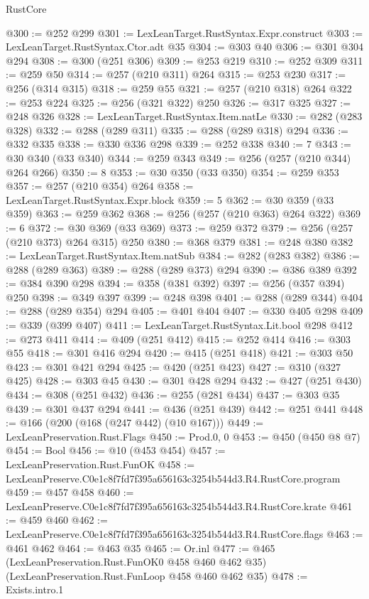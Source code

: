 \begin{lexlean}{RustCore}
\begin{coremodule}
@300 := @252 @299
@301 := LexLeanTarget.RustSyntax.Expr.construct
@303 := LexLeanTarget.RustSyntax.Ctor.adt @35
@304 := @303 @40
@306 := @301 @304 @294
@308 := @300 (@251 @306)
@309 := @253 @219
@310 := @252 @309
@311 := @259 @50
@314 := @257 (@210 @311) @264
@315 := @253 @230
@317 := @256 (@314 @315)
@318 := @259 @55
@321 := @257 (@210 @318) @264
@322 := @253 @224
@325 := @256 (@321 @322) @250
@326 := @317 @325
@327 := @248 @326
@328 := LexLeanTarget.RustSyntax.Item.natLe
@330 := @282 (@283 @328)
@332 := @288 (@289 @311)
@335 := @288 (@289 @318) @294
@336 := @332 @335
@338 := @330 @336 @298
@339 := @252 @338
@340 := 7
@343 := @30 @340 (@33 @340)
@344 := @259 @343
@349 := @256 (@257 (@210 @344) @264 @266)
@350 := 8
@353 := @30 @350 (@33 @350)
@354 := @259 @353
@357 := @257 (@210 @354) @264
@358 := LexLeanTarget.RustSyntax.Expr.block
@359 := 5
@362 := @30 @359 (@33 @359)
@363 := @259 @362
@368 := @256 (@257 (@210 @363) @264 @322)
@369 := 6
@372 := @30 @369 (@33 @369)
@373 := @259 @372
@379 := @256 (@257 (@210 @373) @264 @315) @250
@380 := @368 @379
@381 := @248 @380
@382 := LexLeanTarget.RustSyntax.Item.natSub
@384 := @282 (@283 @382)
@386 := @288 (@289 @363)
@389 := @288 (@289 @373) @294
@390 := @386 @389
@392 := @384 @390 @298
@394 := @358 (@381 @392)
@397 := @256 (@357 @394) @250
@398 := @349 @397
@399 := @248 @398
@401 := @288 (@289 @344)
@404 := @288 (@289 @354) @294
@405 := @401 @404
@407 := @330 @405 @298
@409 := @339 (@399 @407)
@411 := LexLeanTarget.RustSyntax.Lit.bool @298
@412 := @273 @411
@414 := @409 (@251 @412)
@415 := @252 @414
@416 := @303 @55
@418 := @301 @416 @294
@420 := @415 (@251 @418)
@421 := @303 @50
@423 := @301 @421 @294
@425 := @420 (@251 @423)
@427 := @310 (@327 @425)
@428 := @303 @45
@430 := @301 @428 @294
@432 := @427 (@251 @430)
@434 := @308 (@251 @432)
@436 := @255 (@281 @434)
@437 := @303 @35
@439 := @301 @437 @294
@441 := @436 (@251 @439)
@442 := @251 @441
@448 := @166 (@200 (@168 (@247 @442) (@10 @167)))
@449 := LexLeanPreservation.Rust.Flags
@450 := Prod.{0, 0}
@453 := @450 (@450 @8 @7)
@454 := Bool
@456 := @10 (@453 @454)
@457 := LexLeanPreservation.Rust.FunOK
@458 := LexLeanPreserve.C0e1c8f7fd7f395a656163c3254b544d3.R4.RustCore.program
@459 := @457 @458
@460 := LexLeanPreserve.C0e1c8f7fd7f395a656163c3254b544d3.R4.RustCore.krate
@461 := @459 @460
@462 := LexLeanPreserve.C0e1c8f7fd7f395a656163c3254b544d3.R4.RustCore.flags
@463 := @461 @462
@464 := @463 @35
@465 := Or.inl
@477 := @465
    (LexLeanPreservation.Rust.FunOK0 @458 @460 @462 @35)
    (LexLeanPreservation.Rust.FunLoop @458 @460 @462 @35)
@478 := Exists.intro.{1}

\end{coremodule}
\end{lexlean}
